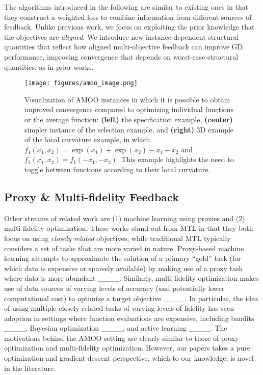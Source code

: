 The algorithms introduced in the following are similar to existing ones in that they construct a weighted loss to combine information from different sources of feedback. Unlike previous work, we focus on exploiting the prior knowledge that the objectives are \emph{aligned}.  We introduce new instance-dependent structural quantities that reflect how aligned multi-objective feedback can improve GD performance, improving convergence that depends on worst-case structural quantities, as in prior works. 


\begin{figure*}[t]
    \centering
    \texttt{[image: figures/amoo\_image.png]}
    \caption{ Visualization of AMOO instances in which it is possible to obtain improved convergence compared to optimizing individual functions or the average function: \textbf{(left)} the specification example, \textbf{(center)} simpler instance of the selection example, and \textbf{(right)} 3D example of the local curvature example, in which $f_1(x_1,x_2)=\exp(x_1)+\exp(x_2)-x_1-x_2$ and $f_2(x_1,x_2)=f_1(-x_1,-x_2)$. This example highlights the need to toggle between functions according to their local curvature.}
    \label{fig:amoo_examples}
\end{figure*}



\subsection{Proxy \& Multi-fidelity Feedback}
Other streams of related work are (1) machine learning using proxies and (2) multi-fidelity optimization. These works stand out from MTL in that they both focus on using \emph{closely related} objectives, while traditional MTL typically considers a set of tasks that are more varied in nature. Proxy-based machine learning attempts to approximate the solution of a primary ``gold'' task (for which data is expensive or sparsely available) by making use of a proxy task where data is more abundant ____. Similarly, multi-fidelity optimization makes use of data sources of varying levels of accuracy (and potentially lower computational cost) to optimize a target objective ____. In particular, the idea of using multiple closely-related tasks of varying levels of fidelity has seen adoption in settings where function evaluations are expensive, including bandits ____, Bayesian optimization ____, and active learning ____. The motivations behind the AMOO setting are clearly similar to those of proxy optimization and multi-fidelity optimization. However, our papers takes a pure optimization and gradient-descent perspective, which to our knowledge, is novel in the literature.


